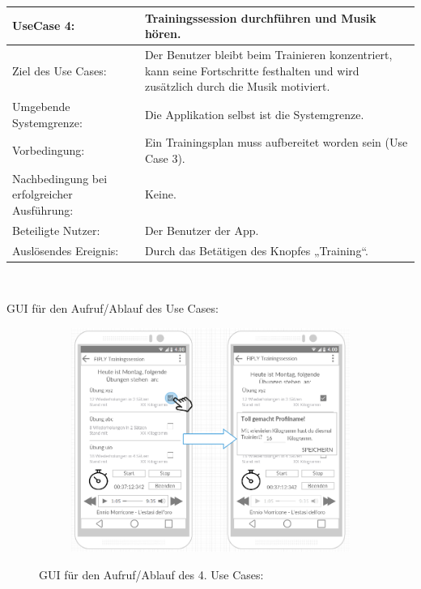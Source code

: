 \documentclass[FIPLY_base.tex]{subfiles}
\begin{document}
	\begin{center}
		\def\arraystretch{1.3}%
		\begin{tabular}{| p{5cm} | p{5cm} |}
			\hline
			UseCase 4: & Trainingssession durchführen und Musik hören. \\ \hline 
			Ziel des Use Cases: & Der Benutzer bleibt beim Trainieren konzentriert, kann seine Fortschritte festhalten und wird zusätzlich durch die Musik motiviert. \\ \hline
			Umgebende Systemgrenze: & Die Applikation selbst ist die Systemgrenze. \\ \hline
			Vorbedingung: & Ein Trainingsplan muss aufbereitet worden sein (Use Case 3).  \\ \hline
			Nachbedingung bei erfolgreicher Ausführung: & Keine.  \\ \hline
			Beteiligte Nutzer: & Der Benutzer der App. \\ \hline
			Auslösendes Ereignis: & Durch das Betätigen des Knopfes „Training“. \\ \hline
		\end{tabular} \\
	\end{center}
	GUI für den Aufruf/Ablauf des Use Cases:
	\begin{figure}[H]
		\begin{subfigure}[b]{0.3\textwidth}
			\includegraphics[scale=0.32]{img/TrainingssessionUebungabgeschlossen}
		\end{subfigure}
		\caption{GUI für den Aufruf/Ablauf des 4. Use Cases:}
	\end{figure}
\end{document}
